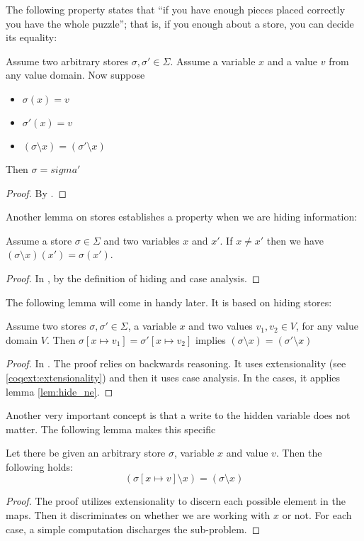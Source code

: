 The following property states that ``if you have enough pieces placed
correctly you have the whole puzzle''; that is, if you enough about a
store, you can decide its equality:
\begin{lem}
\label{lem:hide-eq}
  Assume two arbitrary stores $\sigma, \sigma' \in \Sigma$. Assume a
  variable $x$ and a value $v$ from any value domain. Now suppose
  \begin{itemize}
  \item $\sigma(x) = v$
  \item $\sigma'(x) = v$
  \item $(\sigma \setminus x) = (\sigma' \setminus x)$
  \end{itemize}
  Then $\sigma = sigma'$
\end{lem}
\begin{proof}
  By \coq{}.
\end{proof}

Another lemma on stores establishes a property when we are hiding
information:
\begin{lem}
\label{lem:hide_ne}
  Assume a store $\sigma \in \Sigma$ and two variables $x$ and
  $x'$. If $x \neq x'$ then we have $(\sigma \setminus x)(x') = \sigma(x')$.
\end{lem}
\begin{proof}
  In \coq{}, by the definition of hiding and case analysis.
\end{proof}

The following lemma will come in handy later. It is based on hiding
stores:
\begin{lem}
\label{lem:write_hide}
  Assume two stores $\sigma, \sigma' \in \Sigma$, a variable $x$ and
  two values $v_1, v_2 \in V$, for any value domain $V$. Then
  $\sigma[x \mapsto v_1] = \sigma'[x \mapsto v_2]$ implies $(\sigma
  \setminus x) = (\sigma' \setminus x)$
\end{lem}
\begin{proof}
  In \coq{}. The proof relies on backwards reasoning. It uses
  extensionality (see \ref{coqext:extensionality}) and then it uses
  case analysis. In the cases, it applies lemma \eqref{lem:hide_ne}.
\end{proof}

Another very important concept is that a write to the hidden variable
does not matter. The following lemma makes this specific
\begin{lem}
\label{lem:hide-write}
  Let there be given an arbitrary store $\sigma$, variable $x$ and value
  $v$. Then the following holds:
  \begin{equation*}
    (\sigma[x \mapsto v] \setminus x) = (\sigma \setminus x)
  \end{equation*}
\end{lem}
\begin{proof}
  The proof utilizes extensionality to discern each possible element
  in the maps. Then it discriminates on whether we are working with $x$
  or not. For each case, a simple computation discharges the sub-problem.
\end{proof}

